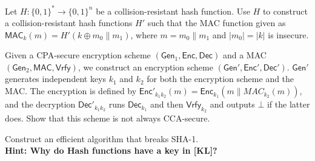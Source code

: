 \documentclass[a4paper,10pt,landscape,twocolumn]{scrartcl}
\begin{document}
\begin{exercise}[HMAC?]
  Let $H: \{0,1\}^*\to \{0,1\}^n$ be a collision-resistant hash function. Use $H$ to construct a collision-resistant hash functions $H'$ such that the MAC function given as $\mathsf{MAC}_k(m)=H'(k\oplus m_0\|m_1)$, where $m=m_0\|m_1$ and $|m_0|=|k|$ is insecure.
\end{exercise}

\begin{exercise}

Given a CPA-secure encryption scheme $(\mathsf{Gen}_1, \mathsf{Enc}, \mathsf{Dec})$ and a MAC $(\mathsf{Gen}_2, \mathsf{MAC}, \mathsf{Vrfy})$, we construct an encryption scheme $(\mathsf{Gen}', \mathsf{Enc}', \mathsf{Dec}')$. $\mathsf{Gen}'$ generates independent keys $k_1$ and $k_2$ for both the encryption scheme and the MAC. The encryption is defined by $\mathsf{Enc}'_{k_1k_2}(m)=\mathsf{Enc}_{k_1}(m\|MAC_{k_2}(m))$, and the decryption $\mathsf{Dec}'_{k_1k_2}$ runs $\mathsf{Dec}_{k_1}$ and then $\mathsf{Vrfy}_{k_2}$ and outputs $\bot$ if the latter does. Show that this scheme is not always CCA-secure.


\end{exercise}






\begin{bonusexercise}[SHA-1]
	Construct an efficient algorithm that breaks SHA-1.\\
	\textbf{Hint: Why do Hash functions have a key in [KL]?}
\end{bonusexercise}
\end{document}
